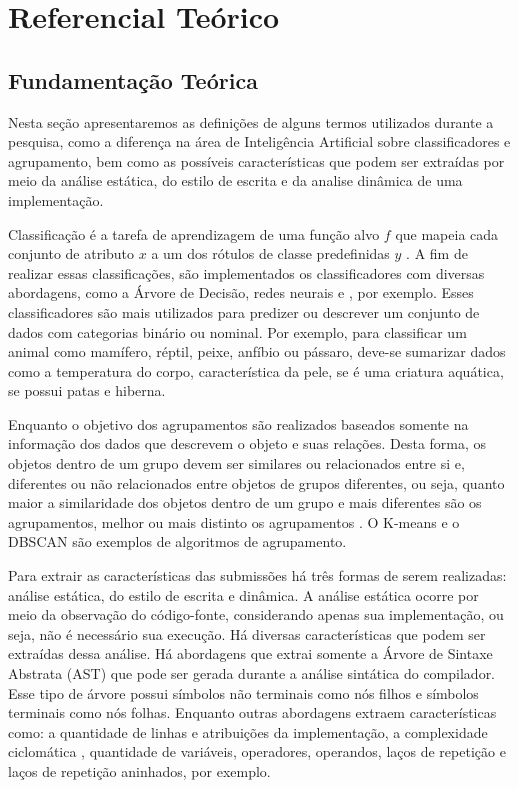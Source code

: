 \chapter{Referencial Teórico}

	\section{Fundamentação Teórica}
		Nesta seção apresentaremos as definições de alguns termos utilizados
		durante a pesquisa, como a diferença na área de Inteligência Artificial
		sobre classificadores e agrupamento, bem como as possíveis características
		que podem ser extraídas por meio da análise estática, do estilo de escrita
		e da analise dinâmica de uma implementação.
		
		Classificação é a tarefa de aprendizagem de uma função alvo $f$ que mapeia cada
		conjunto de atributo $x$ a um dos rótulos de classe predefinidas $y$ \cite{Tan:2005:ch4}. A
		fim de realizar essas classificações, são implementados os classificadores com
		diversas abordagens, como a Árvore de Decisão, redes neurais e , por exemplo. Esses classificadores são mais utilizados para
		predizer ou descrever um conjunto de dados com categorias binário ou nominal.
		Por exemplo, para classificar um animal como mamífero, réptil, peixe, anfíbio
		ou pássaro, deve-se sumarizar dados como a temperatura do corpo, característica
		da pele, se é uma criatura aquática, se possui patas e hiberna.
		
		Enquanto o objetivo dos agrupamentos são realizados baseados somente na informação
		dos dados que descrevem o objeto e suas relações. Desta forma, os objetos dentro
		de um grupo devem ser similares ou relacionados entre si e, diferentes ou não
		relacionados entre objetos de grupos diferentes, ou seja, quanto maior a similaridade
		dos objetos dentro de um grupo e mais diferentes são os agrupamentos, melhor ou mais
		distinto os agrupamentos \cite{Tan:2005:ch8}. O K-means e o DBSCAN são exemplos de algoritmos de
		agrupamento.
		
		Para extrair as características das submissões há três formas de serem realizadas:
		análise estática, do estilo de escrita e dinâmica. A análise estática ocorre por meio
		da observação do código-fonte, considerando apenas sua implementação, ou seja, não
		é necessário sua execução. Há diversas características que podem ser extraídas dessa
		análise. Há abordagens que extrai somente a Árvore de Sintaxe Abstrata (AST) que pode
		ser gerada durante a análise sintática do compilador. Esse tipo de árvore possui símbolos
		não terminais como nós filhos e símbolos terminais como nós folhas. Enquanto outras
		abordagens extraem características como: a quantidade de linhas e atribuições da
		implementação, a complexidade ciclomática \cite{mccabe}, quantidade de variáveis, 
		operadores, operandos, laços de repetição e laços de repetição aninhados, por exemplo.
		
